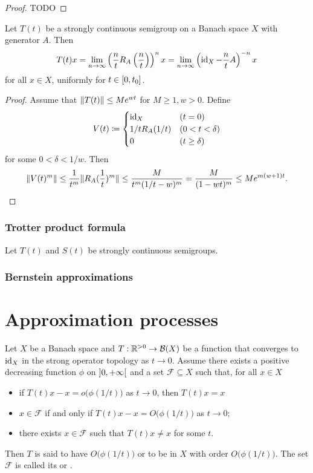 \begin{proof}
TODO
\end{proof}
\begin{corollary}
Let $T(t)$ be a strongly continuous semigroup on a Banach space $X$ with generator $A$. Then
\[ T(t)x = \lim_{n\to\infty}\left(\frac{n}{t} R_{A}\left(\frac{n}{t}\right)\right)^nx = \lim_{n\to\infty}\left(\operatorname{id}_X - \frac{n}{t} A\right)^{-n}x \]
for all $x\in X$, uniformly for $t\in\interval{0,t_0}$.
\end{corollary}
\begin{proof}
Assume that $\lVert T(t)\rVert\leq Me^{wt}$ for $M\geq 1, w> 0$. Define
\[ V(t) \coloneqq \begin{cases}
\operatorname{id}_X & (t=0) \\
1/t R_A(1/t) & (0<t<\delta) \\
0 & (t\geq \delta)
\end{cases} \]
for some $0<\delta<1/w$. Then
\[ \lVert V(t)^m\rVert \leq \frac{1}{t^m}\lVert R_A(\frac{1}{t})^m\rVert \leq \frac{M}{t^m (1/t - w)^m} = \frac{M}{(1-wt)^m} \leq Me^{m(w+1)t}. \]
\end{proof}

\subsubsection{Trotter product formula}

\begin{proposition}
Let $T(t)$ and $S(t)$ be strongly continuous semigroups.
\end{proposition}

\subsubsection{Bernstein approximations}

\section{Approximation processes}
\begin{definition}
Let $X$ be a Banach space and $T: \mathbb{R}^{> 0}\to \operatorname{\mathcal{B}}(X)$ be a function that converges to $\operatorname{id}_X$ in the strong operator topology as $t\to 0$. Assume there exists a positive decreasing function $\phi$ on $\interval[o]{0,+\infty}$ and a set $\mathcal{F}\subseteq X$ such that, for all $x\in X$
\begin{itemize}
\item if $T(t)x - x = o\big(\phi(1/t)\big)$ as $t\to 0$, then $T(t)x = x$
\item $x\in \mathcal{F}$ \textup{if and only if} $T(t)x-x = O\big(\phi(1/t)\big)$ as $t\to 0$;
\item there exists $x\in \mathcal{F}$ such that $T(t)x \neq x$ for some $t$.
\end{itemize}
Then $T$ is said to have  $O\big(\phi(1/t)\big)$ or to be  in $X$ with order $O\big(\phi(1/t)\big)$. The set $\mathcal{F}$ is called its  or .
\end{definition}

